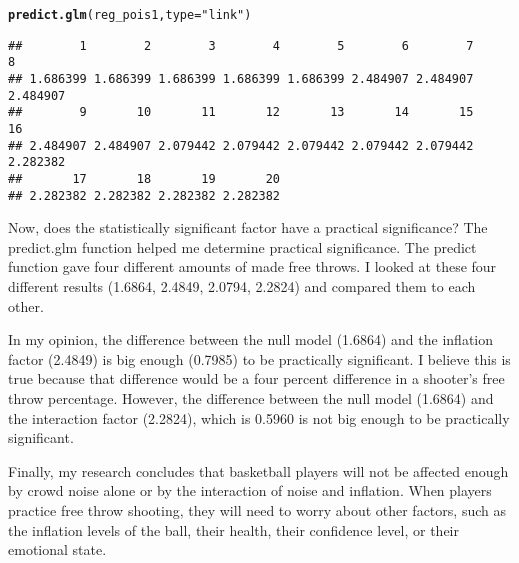 \documentclass[12pt]{article}\usepackage[]{graphicx}\usepackage[]{color}
\makeatletter
\newcommand{\hlstr}[1]{\textcolor[rgb]{0.192,0.494,0.8}{#1}}%
\newcommand{\hlstd}[1]{\textcolor[rgb]{0.345,0.345,0.345}{#1}}%
\newcommand{\hlkwc}[1]{\textcolor[rgb]{0.333,0.667,0.333}{#1}}%
\newcommand{\hlkwd}[1]{\textcolor[rgb]{0.737,0.353,0.396}{\textbf{#1}}}%
\newenvironment{kframe}{%
 \def\at@end@of@kframe{}%
 \ifinner\ifhmode%
  \def\at@end@of@kframe{\end{minipage}}%
  \begin{minipage}{\columnwidth}%
 \fi\fi%
 \def\FrameCommand##1{\hskip\@totalleftmargin \hskip-\fboxsep
 \colorbox{shadecolor}{##1}\hskip-\fboxsep
     \hskip-\linewidth \hskip-\@totalleftmargin \hskip\columnwidth}%
 \MakeFramed {\advance\hsize-\width
   \@totalleftmargin\z@ \linewidth\hsize
   \@setminipage}}%
 {\par\unskip\endMakeFramed%
 \at@end@of@kframe}
\newenvironment{knitrout}{}{} %
\makeatother
\begin{document}
\begin{knitrout}
\color{fgcolor}\begin{kframe}
\begin{alltt}
\hlkwd{predict.glm}\hlstd{(reg_pois1,} \hlkwc{type} \hlstd{=} \hlstr{"link"}\hlstd{)}
\end{alltt}
\begin{verbatim}
##        1        2        3        4        5        6        7        8 
## 1.686399 1.686399 1.686399 1.686399 1.686399 2.484907 2.484907 2.484907 
##        9       10       11       12       13       14       15       16 
## 2.484907 2.484907 2.079442 2.079442 2.079442 2.079442 2.079442 2.282382 
##       17       18       19       20 
## 2.282382 2.282382 2.282382 2.282382
\end{verbatim}
\end{kframe}
\end{knitrout}

Now, does the statistically significant factor have a practical significance? The predict.glm function helped me determine practical significance. The predict function gave four different amounts of made free throws. I looked at these four different results (1.6864, 2.4849, 2.0794, 2.2824) and compared them to each other.

In my opinion, the difference between the null model (1.6864) and the inflation factor (2.4849) is big enough (0.7985) to be practically significant. I believe this is true because that difference would be a four percent difference in a shooter's free throw percentage. However, the difference between the null model (1.6864) and the interaction factor (2.2824), which is 0.5960 is not big enough to be practically significant. 

Finally, my research concludes that basketball players will not be affected enough by crowd noise alone or by the interaction of noise and inflation. When players practice free throw shooting, they will need to worry about other factors, such as the inflation levels of the ball, their health, their confidence level, or their emotional state. 
\\






\end{document}
